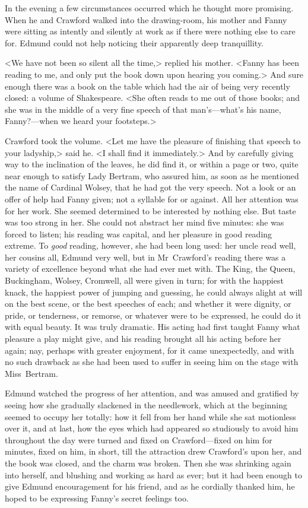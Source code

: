 In the evening a few circumstances occurred which he thought more promising. When he and Crawford walked into the drawing-room, his mother and Fanny were sitting as intently and silently at work as if there were nothing else to care for. Edmund could not help noticing their apparently deep tranquillity.

<We have not been so silent all the time,> replied his mother. <Fanny has been reading to me, and only put the book down upon hearing you coming.> And sure enough there was a book on the table which had the air of being very recently closed: a volume of Shakespeare. <She often reads to me out of those books; and she was in the middle of a very fine speech of that man's—what's his name, Fanny?—when we heard your footsteps.>

Crawford took the volume. <Let me have the pleasure of finishing that speech to your ladyship,> said he. <I shall find it immediately.> And by carefully giving way to the inclination of the leaves, he did find it, or within a page or two, quite near enough to satisfy Lady Bertram, who assured him, as soon as he mentioned the name of Cardinal Wolsey, that he had got the very speech. Not a look or an offer of help had Fanny given; not a syllable for or against. All her attention was for her work. She seemed determined to be interested by nothing else. But taste was too strong in her. She could not abstract her mind five minutes: she was forced to listen; his reading was capital, and her pleasure in good reading extreme. To \textit{good}  reading, however, she had been long used: her uncle read well, her cousins all, Edmund very well, but in Mr~Crawford's reading there was a variety of excellence beyond what she had ever met with. The King, the Queen, Buckingham, Wolsey, Cromwell, all were given in turn; for with the happiest knack, the happiest power of jumping and guessing, he could always alight at will on the best scene, or the best speeches of each; and whether it were dignity, or pride, or tenderness, or remorse, or whatever were to be expressed, he could do it with equal beauty. It was truly dramatic. His acting had first taught Fanny what pleasure a play might give, and his reading brought all his acting before her again; nay, perhaps with greater enjoyment, for it came unexpectedly, and with no such drawback as she had been used to suffer in seeing him on the stage with Miss~Bertram.

Edmund watched the progress of her attention, and was amused and gratified by seeing how she gradually slackened in the needlework, which at the beginning seemed to occupy her totally: how it fell from her hand while she sat motionless over it, and at last, how the eyes which had appeared so studiously to avoid him throughout the day were turned and fixed on Crawford—fixed on him for minutes, fixed on him, in short, till the attraction drew Crawford's upon her, and the book was closed, and the charm was broken. Then she was shrinking again into herself, and blushing and working as hard as ever; but it had been enough to give Edmund encouragement for his friend, and as he cordially thanked him, he hoped to be expressing Fanny's secret feelings too.


